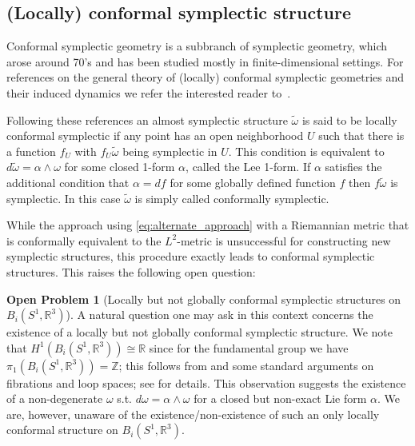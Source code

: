 \documentclass[12pt]{amsart}
\newcommand{\rev}[1]{#1}
\theoremstyle{definition}
\newtheorem{question}[theorem]{Open Problem}
\newcommand{\R}{\mathbb R}
\def\R{{\mathbb R}}
\begin{document}
\rev{
\subsection*{(Locally) conformal symplectic structure}
Conformal symplectic geometry is a subbranch of symplectic geometry, which arose around 70's and has been studied mostly in finite-dimensional settings. 
 For references on the general theory of (locally) conformal symplectic geometries and their induced dynamics we refer the interested reader to~\cite{vaisman1985locally,yezzi2005conformal,allais2024conformalDampingDynamics}.
 
 
Following these references an almost symplectic structure  $\tilde\omega$ is said to be locally conformal symplectic if any point has an open neighborhood $U$ such that there is a function $f_U$ with $f_U\tilde \omega$ being symplectic in $U$. This condition is equivalent to $d\tilde\omega=\alpha\wedge \omega$ for some closed 1-form $\alpha$, called the Lee 1-form. If $\alpha$ satisfies the additional condition that $\alpha=df$ for some globally defined function $f$ then $f\tilde \omega$ is symplectic. In this case $\tilde\omega$ is simply called conformally symplectic.  

While the approach using \eqref{eq:alternate_approach} with a Riemannian metric that is conformally equivalent to the $L^2$-metric is unsuccessful for constructing new symplectic structures,  this procedure exactly leads to conformal symplectic structures. This raises the following open question:
\begin{question}
    [Locally but not globally conformal symplectic structures on $B_i(S^1,\R^3)$]
    A natural question one may ask in this context concerns the existence of a locally but not globally conformal symplectic structure. We note that $H^1(B_i(S^1,\R^3))\cong \R$ since 
 for the fundamental group we have $\pi_1(B_i(S^1,\R^3)) = \mathbb Z$; this follows from \cite{Smale59} and some standard arguments on fibrations and loop spaces; see \cite{Adachi93} for details. This observation suggests the existence of a non-degenerate $\omega$ s.t. $d\omega=\alpha\wedge \omega$ for a closed but non-exact Lie form $\alpha$.  We are, however,  unaware of the existence/non-existence of such an only locally conformal structure on $B_i(S^1,\R^3)$.
\end{question}
}
\end{document}
